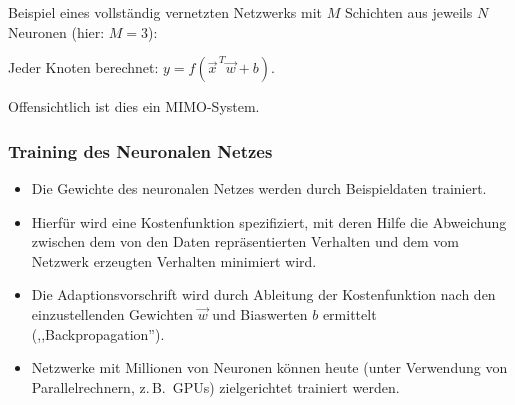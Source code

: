\begin{beispiel}
Beispiel eines vollständig vernetzten Netzwerks mit $M$ Schichten aus jeweils $N$ Neuronen (hier: $M = 3$):


Jeder Knoten berechnet: $y = f(\vec{x}^{\,T}\vec{w} + b)$.

Offensichtlich ist dies ein MIMO-System.

\subsubsection*{Training des Neuronalen Netzes}

\begin{itemize}
  \item Die Gewichte des neuronalen Netzes werden durch Beispieldaten trainiert.
  \item Hierfür wird eine Kostenfunktion spezifiziert, mit deren Hilfe die Abweichung zwischen dem von den Daten repräsentierten Verhalten und dem vom Netzwerk erzeugten Verhalten minimiert wird.
  \item Die Adaptionsvorschrift wird durch Ableitung der Kostenfunktion nach den einzustellenden Gewichten $\vec{w}$ und Biaswerten $b$ ermittelt (,,Backpropagation'').
  \item Netzwerke mit Millionen von Neuronen können heute (unter Verwendung von Parallelrechnern, z.\,B.\ GPUs) zielgerichtet trainiert werden.
\end{itemize}
\end{beispiel}

